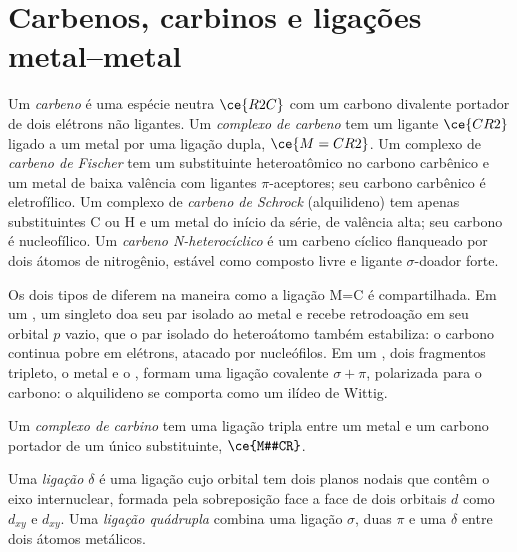 \section{Carbenos, carbinos e ligações metal--metal}

\begin{definition}\label{def:b3:organometallic-bonding:carbene}
Um \emph{carbeno} é uma espécie neutra $\ce{R2C}$ com um carbono divalente
portador de dois elétrons não ligantes. Um \emph{complexo de carbeno}
tem um ligante $\ce{CR2}$ ligado a um metal por uma ligação dupla, $\ce{M=CR2}$. Um complexo de
\emph{carbeno de Fischer} tem um substituinte heteroatômico
no carbono carbênico e um metal de baixa valência com ligantes $\pi$-aceptores; seu carbono
carbênico é eletrofílico. Um complexo de \emph{carbeno de Schrock} (alquilideno)
tem apenas substituintes C ou H e um metal do início da série, de valência alta; seu carbono é
nucleofílico. Um \emph{carbeno N-heterocíclico} é um
carbeno cíclico flanqueado por dois átomos de nitrogênio, estável como composto livre e
ligante $\sigma$-doador forte.
\end{definition}

Os dois tipos de  diferem na maneira como a ligação M=C é compartilhada.
Em um , um  singleto doa seu par isolado ao metal e
recebe retrodoação em seu orbital $p$ vazio, que o par isolado do heteroátomo
também estabiliza: o carbono continua pobre em elétrons, atacado por nucleófilos. Em um
, dois fragmentos tripleto, o metal e o , formam uma ligação covalente $\sigma +
\pi$, polarizada para o carbono: o alquilideno se comporta como um ilídeo de Wittig.

\begin{definition}\label{def:b3:organometallic-bonding:carbyne}
Um \emph{complexo de carbino} tem uma ligação tripla entre um metal
e um carbono portador de um único substituinte, $\ce{M#CR}$.
\end{definition}

\begin{definition}\label{def:b3:organometallic-bonding:delta}
Uma \emph{ligação $\delta$} é uma ligação cujo orbital tem dois planos nodais
que contêm o eixo internuclear, formada pela sobreposição face a face de dois orbitais $d$
como $d_{xy}$ e $d_{xy}$. Uma \emph{ligação quádrupla}
combina uma ligação $\sigma$, duas $\pi$ e uma $\delta$ entre dois átomos metálicos.
\end{definition}


